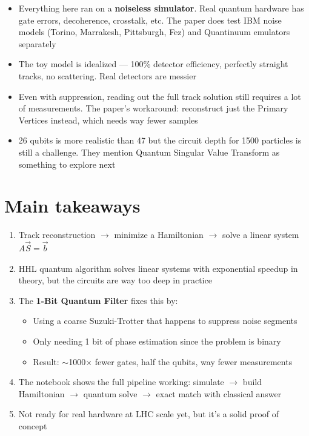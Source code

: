 \documentclass[11pt, a4paper]{article}
\begin{document}
\begin{itemize}
  \item Everything here ran on a \textbf{noiseless simulator}. Real quantum
        hardware has gate errors, decoherence, crosstalk, etc. The paper
        does test IBM noise models (Torino, Marrakesh, Pittsburgh, Fez) and
        Quantinuum emulators separately

  \item The toy model is idealized --- 100\% detector efficiency, perfectly
        straight tracks, no scattering. Real detectors are messier

  \item Even with suppression, reading out the full track solution still
        requires a lot of measurements. The paper's workaround: reconstruct
        just the Primary Vertices instead, which needs way fewer samples

  \item 26 qubits is more realistic than 47 but the circuit depth for 1500
        particles is still a challenge. They mention Quantum Singular Value
        Transform as something to explore next
\end{itemize}

\section{Main takeaways}

\begin{enumerate}
  \item Track reconstruction $\to$ minimize a Hamiltonian $\to$ solve a
        linear system $A\vec{S} = \vec{b}$

  \item HHL quantum algorithm solves linear systems with exponential
        speedup in theory, but the circuits are way too deep in practice

  \item The \textbf{1-Bit Quantum Filter} fixes this by:
  \begin{itemize}
    \item Using a coarse Suzuki-Trotter that happens to suppress noise
          segments
    \item Only needing 1 bit of phase estimation since the problem is
          binary
    \item Result: $\sim$1000$\times$ fewer gates, half the qubits, way
          fewer measurements
  \end{itemize}

  \item The notebook shows the full pipeline working: simulate
        $\to$ build Hamiltonian $\to$ quantum solve $\to$ exact match with
        classical answer

  \item Not ready for real hardware at LHC scale yet, but it's a solid
        proof of concept
\end{enumerate}
\end{document}
